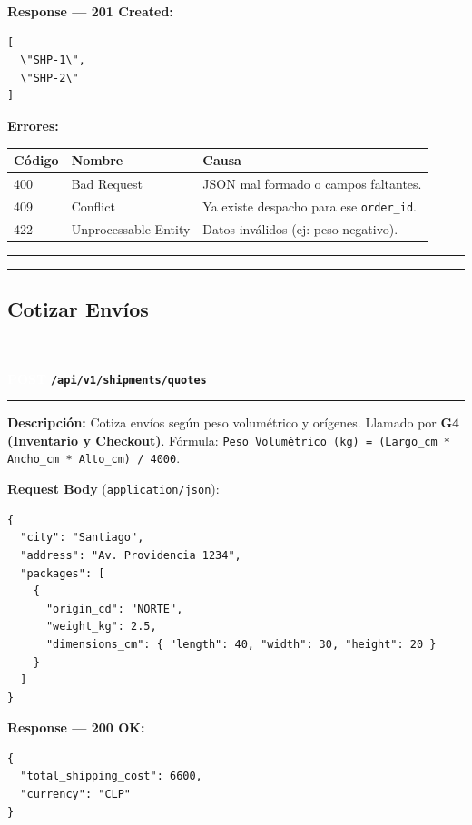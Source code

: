 \documentclass[11pt, a4paper]{article}
\newcommand{\httpmethod}[2]{%
  \colorbox{#1}{\textcolor{white}{\textbf{\small\textsf{#2}}}}%
}
\newcommand{\routeheader}[3]{%
  \noindent\rule{\textwidth}{1.5pt}\\[0.3em]
  \httpmethod{#1}{#2}\;\texttt{\bfseries #3}\\[0.3em]
  \rule{\textwidth}{0.4pt}
  \vspace{0.3cm}
}
\begin{document}
\textbf{Response --- 201 Created:}

\begin{lstlisting}
[
  \"SHP-1\",
  \"SHP-2\"
]
\end{lstlisting}

\textbf{Errores:}
\begin{table}[h!]
\small
\begin{tabularx}{\textwidth}{l l X}
  \toprule
  \textbf{Código} & \textbf{Nombre} & \textbf{Causa} \\
  \midrule
  400 & Bad Request          & JSON mal formado o campos faltantes. \\
  409 & Conflict             & Ya existe despacho para ese \texttt{order\_id}. \\
  422 & Unprocessable Entity & Datos inválidos (ej: peso negativo). \\
  \bottomrule
\end{tabularx}
\end{table}

\noindent\rule{\textwidth}{0.4pt}


\noindent\rule{\textwidth}{0.4pt}

\subsection{Cotizar Envíos}

\routeheader{post}{POST}{/api/v1/shipments/quotes}

\textbf{Descripción:} Cotiza envíos según peso volumétrico y orígenes. Llamado por \textbf{G4 (Inventario y Checkout)}.
Fórmula: \texttt{Peso Volumétrico (kg) = (Largo\_cm * Ancho\_cm * Alto\_cm) / 4000}.

\vspace{0.3cm}
\textbf{Request Body} (\texttt{application/json}):

\begin{lstlisting}
{
  "city": "Santiago",
  "address": "Av. Providencia 1234",
  "packages": [
    {
      "origin_cd": "NORTE",
      "weight_kg": 2.5,
      "dimensions_cm": { "length": 40, "width": 30, "height": 20 }
    }
  ]
}
\end{lstlisting}

\textbf{Response --- 200 OK:}

\begin{lstlisting}
{
  "total_shipping_cost": 6600,
  "currency": "CLP"
}
\end{lstlisting}
\end{document}
